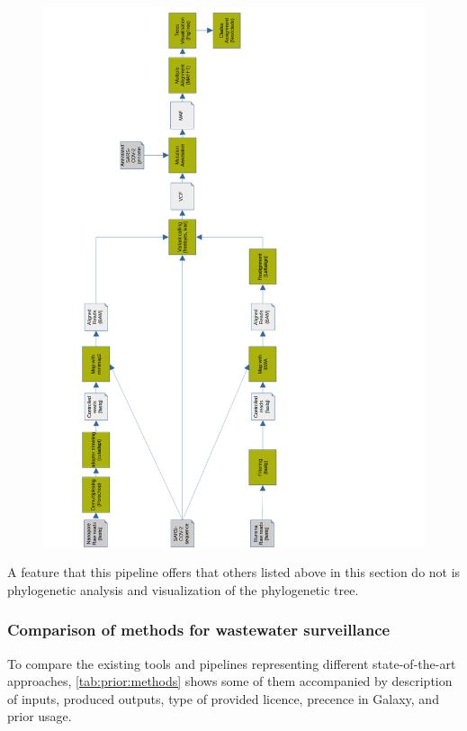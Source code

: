         \begin{figure}[h]
        	\centering
            \includegraphics[width=1\textwidth]{figures/prior/Izquierdo-Lara_vertical.png}
            \label{fig:prior:izquierdo}
        \end{figure}
        
        A feature that this pipeline offers that others listed above in this section do not is phylogenetic analysis and visualization of the phylogenetic tree.
        
        \subsubsection{Comparison of methods for wastewater surveillance}
        To compare the existing tools and pipelines representing different state-of-the-art approaches, \cref{tab:prior:methods} shows some of them accompanied by description of inputs, produced outputs, type of provided licence, precence in Galaxy, and prior usage.
        
